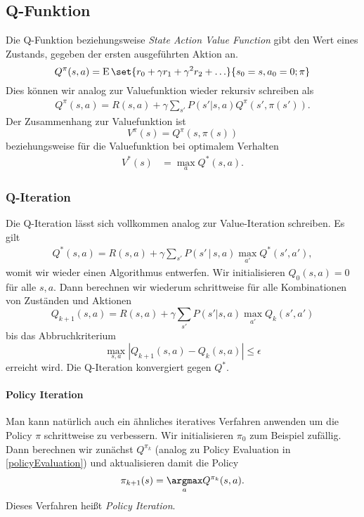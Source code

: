 \documentclass[ngerman]{../LaTeX-Templates/Paper/paper}
\newcommand{\E}{\ensuremath{\operatorname{E}}}
\begin{document}
\subsection{Q-Funktion}
Die Q-Funktion beziehungsweise \emph{State Action Value Function} gibt den Wert eines Zustands, gegeben der ersten ausgeführten Aktion an.
\begin{equation*}
	Q^\pi(s,a)=\E\set{r_0+\gamma r_1+\gamma^2 r_2+\ldots}{s_0=s,a_0=0;\pi}
\end{equation*}
Dies können wir analog zur Valuefunktion wieder rekursiv schreiben als
\begin{align*}
	Q^\pi(s,a)=R(s,a)+\gamma\sum_{s'}P(s'|s,a)Q^\pi(s',\pi(s')).
\end{align*}
Der Zusammenhang zur Valuefunktion ist
\begin{equation*}
	V^\pi(s)=Q^\pi(s,\pi(s))
\end{equation*}
beziehungsweise für die Valuefunktion bei optimalem Verhalten
\begin{align*}
	V^\ast(s)&=\max_aQ^\ast(s,a).
\end{align*}

\subsubsection{Q-Iteration}
Die Q-Iteration lässt sich vollkommen analog zur Value-Iteration schreiben. Es gilt 
\begin{align*}
	Q^\ast(s,a)=R(s,a)+\gamma\sum_{s'}P(s'\,|\,s,a)\max_{a'}Q^\ast (s',a'),
\end{align*}
womit wir wieder einen Algorithmus entwerfen.
Wir initialisieren $Q_0(s,a)=0$ für alle $s,a$.
Dann berechnen wir wiederum schrittweise für alle Kombinationen von Zuständen und Aktionen
\begin{equation*}
	Q_{k+1}(s,a)=R(s,a)+\gamma\sum_{s'}P(s'|s,a)\max_{a'}Q_{k}(s',a')
\end{equation*}
bis das Abbruchkriterium 
\begin{equation*}
	\max_{s,a}|Q_{k+1}(s,a)-Q_k(s,a)|\leq \epsilon
\end{equation*}
erreicht wird.
Die Q-Iteration konvergiert gegen $Q^\ast$.

\paragraph{Policy Iteration}
Man kann natürlich auch ein ähnliches iteratives Verfahren anwenden um die Policy $\pi$ schrittweise zu verbessern.
Wir initialisieren $\pi_0$ zum Beispiel zufällig.
Dann berechnen wir zunächst $Q^{\pi_k}$ (analog zu Policy Evaluation in \autoref{policyEvaluation}) und aktualisieren damit die Policy
\begin{equation*}
	\pi_{k+1}(s)=\underset a\argmax Q^{\pi_k}(s,a).
\end{equation*}
Dieses Verfahren heißt \emph{Policy Iteration}.
\end{document}
